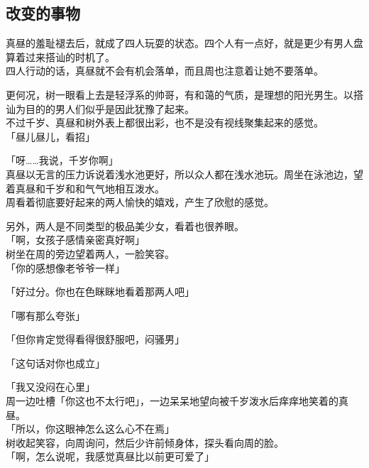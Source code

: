 \subsection{改变的事物}

真昼的羞耻褪去后，就成了四人玩耍的状态。四个人有一点好，就是更少有男人盘算着过来搭讪的时机了。\\

四人行动的话，真昼就不会有机会落单，而且周也注意着让她不要落单。

更何况，树一眼看上去是轻浮系的帅哥，有和蔼的气质，是理想的阳光男生。以搭讪为目的的男人们似乎是因此犹豫了起来。\\

不过千岁、真昼和树外表上都很出彩，也不是没有视线聚集起来的感觉。\\

「昼儿昼儿，看招」

「呀……我说，千岁你啊」\\

真昼以无言的压力诉说着浅水池更好，所以众人都在浅水池玩。周坐在泳池边，望着真昼和千岁和和气气地相互泼水。\\

周看着彻底要好起来的两人愉快的嬉戏，产生了欣慰的感觉。

另外，两人是不同类型的极品美少女，看着也很养眼。\\

「啊，女孩子感情亲密真好啊」\\

树坐在周的旁边望着两人，一脸笑容。\\

「你的感想像老爷爷一样」

「好过分。你也在色眯眯地看着那两人吧」

「哪有那么夸张」

「但你肯定觉得看得很舒服吧，闷骚男」

「这句话对你也成立」

「我又没闷在心里」\\

周一边吐槽「你这也不太行吧」，一边呆呆地望向被千岁泼水后痒痒地笑着的真昼。\\

「所以，你这眼神怎么这么心不在焉」\\

树收起笑容，向周询问，然后少许前倾身体，探头看向周的脸。\\

「啊，怎么说呢，我感觉真昼比以前更可爱了」

